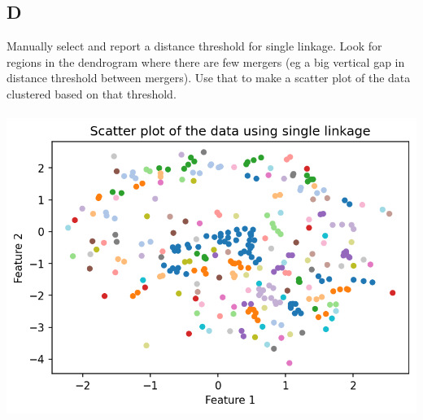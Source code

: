 \documentclass[12pt]{article}
\begin{document}
\subsection{D}
Manually select and report a distance threshold for single linkage. Look for regions in the dendrogram where there are few mergers (eg a big vertical gap in distance threshold between mergers). Use that to make a scatter plot of the data clustered based on that threshold.\\\\
\includegraphics[width=1\textwidth]{p2.d.png}
\end{document}
